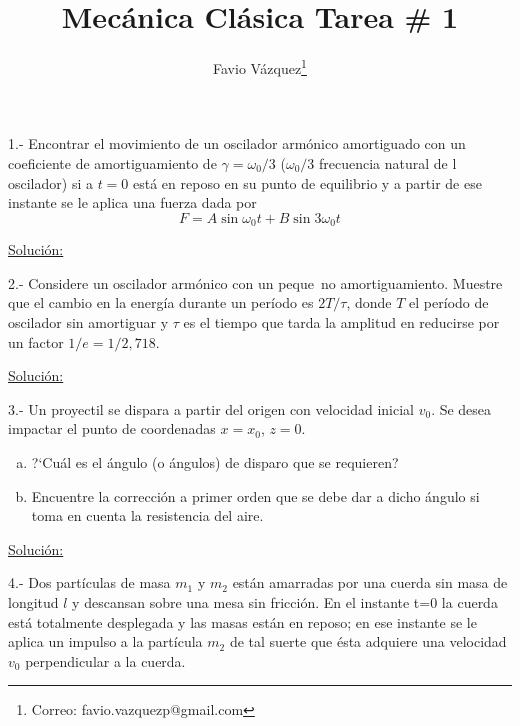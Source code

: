 \documentclass[a4paper,10pt]{article}
\title{Mec\'anica Cl\'asica Tarea \# 1}
\author{Favio V\'azquez\thanks{Correo: favio.vazquezp@gmail.com}}\affil{Instituto de F\'isica. Universidad Nacional Aut\'onoma de M\'exico}
\date{}
\begin{document}
\makeatletter
\def\@maketitle{%
  \newpage
  \null
  \vskip 2em%
  \begin{center}%
  \let \footnote \thanks
    {\Large\bfseries \@title \par}%
    \vskip 1.5em%
    {\normalsize
      \lineskip .5em%
      \begin{tabular}[t]{c}%
        \@author
      \end{tabular}\par}%
    \vskip 1em%
    {\normalsize \@date}%
  \end{center}%
  \par
  \vskip 1.5em}
\makeatother

\maketitle

1.- Encontrar el movimiento de un oscilador arm\'onico amortiguado
con un coeficiente de amortiguamiento de $\gamma = \omega_{0}/3$ 
($\omega_{0}/3$ frecuencia natural de l oscilador) si a $t=0$ est\'a 
en reposo en su punto de equilibrio y a partir de ese instante se le
aplica una fuerza dada por $$F=A\sin{\omega_{0}t}+B\sin{3\omega_{0}t}$$

\vspace{.3cm}

\underline{Soluci\'on:}

\vspace{.3cm}

2.- Considere un oscilador arm\'onico con un peque~no amortiguamiento.
Muestre que el cambio en la energ\'ia durante un per\'iodo es $2T/\tau$,
donde $T$ el per\'iodo de oscilador sin amortiguar y $\tau$ es el tiempo
que tarda la amplitud en reducirse por un factor $1/e=1/2,718$.

\vspace{.3cm}

\underline{Soluci\'on:}

\vspace{.3cm}

3.- Un proyectil se dispara a partir del origen con velocidad inicial $v_{0}$.
Se desea impactar el punto de coordenadas $x=x_{0}$, $z=0$.

\begin{enumerate}[a)]
 \item ?`Cu\'al es el \'angulo (o \'angulos) de disparo que se requieren?
 \item Encuentre la correcci\'on a primer orden que se debe dar a dicho \'angulo si toma 
 en cuenta la resistencia del aire.
\end{enumerate}
\vspace{.3cm}

\underline{Soluci\'on:}

\vspace{.3cm}

4.- Dos part\'iculas de masa $m_1$ y $m_2$ est\'an amarradas por una cuerda sin masa de 
longitud $l$ y descansan sobre una mesa sin fricci\'on. En el instante t=0 la cuerda
está totalmente desplegada y las masas están en reposo; en ese instante se le aplica
un impulso a la partícula $m_2$ de tal suerte que ésta adquiere una velocidad $v_0$ 
perpendicular a la cuerda.
\end{document}
